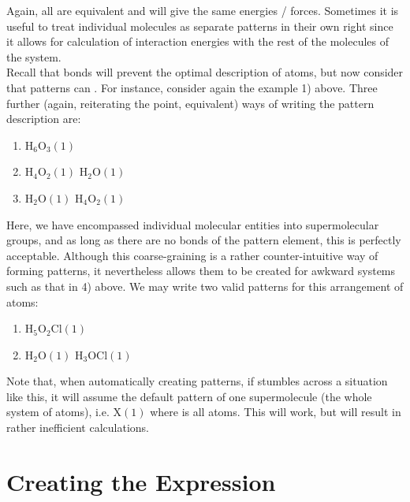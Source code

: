 Again, all are equivalent and will give the same energies / forces. Sometimes it is useful to treat individual molecules as separate patterns in their own right since it allows for calculation of interaction energies with the rest of the molecules of the system. \\

Recall that bonds  will prevent the optimal description of atoms, but now consider that patterns can . For instance, consider again the example 1) above. Three further (again, reiterating the point, equivalent) ways of writing the pattern description are:

\begin{enumerate}
	\item H$_6$O$_3(1)$
	\item H$_4$O$_2(1)$ H$_2$O$(1)$
	\item H$_2$O$(1)$ H$_4$O$_2(1)$
\end{enumerate}

Here, we have encompassed individual molecular entities into supermolecular groups, and as long as there are no bonds  of the pattern element, this is perfectly acceptable. Although this coarse-graining is a rather counter-intuitive way of forming patterns, it nevertheless allows them to be created for awkward systems such as that in 4) above. We may write two valid patterns for this arrangement of atoms:

\begin{enumerate}
	\item H$_5$O$_2$Cl$(1)$
	\item H$_2$O$(1)$ H$_3$OCl$(1)$
\end{enumerate}

Note that, when automatically creating patterns, if \progname{} stumbles across a situation like this, it will assume the default pattern of one supermolecule (the whole system of atoms), i.e. X$(1)$ where  is all atoms. This will work, but will result in rather inefficient calculations.

\section{Creating the Expression}


